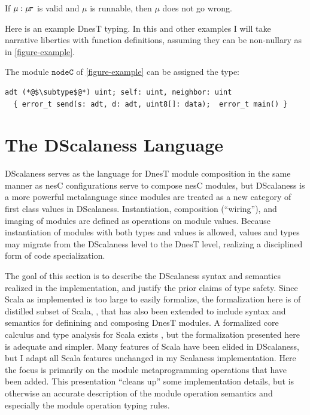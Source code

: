 \declmodtypingfig

\begin{conject}
  If $\mu : \mu\!\tau$ is valid and $\mu$ is runnable, then $\mu$ does not go wrong.
\end{conject}
Here is an example DnesT typing. In this and other examples I will take narrative liberties with
function definitions, assuming they can be non-nullary as in \autoref{figure-example}.
\begin{example}
\label{example-nesttyping}
The module $\texttt{nodeC}$ of \autoref{figure-example} can be assigned the type:
\singlespace
\lstset{numbers=none, basicstyle=\ttfamily} 
\begin{lstlisting}
adt (*@$\subtype$@*) uint; self: uint, neighbor: uint
  { error_t send(s: adt, d: adt, uint8[]: data);  error_t main() }
\end{lstlisting}
\primaryspacing
\end{example}


\section{The DScalaness Language}
\label{section-scalaness-theory}

DScalaness serves as the language for DnesT module composition in the same manner as nesC
configurations serve to compose nesC modules, but DScalaness is a more powerful metalanguage
since modules are treated as a new category of first class values in DScalaness. Instantiation,
composition (``wiring''), and imaging of modules are defined as operations on module values.
Because instantiation of modules with both types and values is allowed, values and types may
migrate from the DScalaness level to the DnesT level, realizing a disciplined form of code
specialization.

The goal of this section is to describe the DScalaness syntax and semantics realized in the
implementation, and justify the prior claims of type safety. Since Scala as implemented is too
large to easily formalize, the formalization here is of distilled subset of Scala,
, that has also been extended to include syntax and semantics for definining
and composing DnesT modules. A formalized core calculus and type analysis for Scala exists
\cite{Cremet:2006:CCS:2135978.2135980}, but the formalization presented here is adequate and
simpler. Many features of Scala have been elided in DScalaness, but I adapt all Scala features
unchanged in my Scalaness implementation. Here the focus is primarily on the module
metaprogramming operations that have been added. This presentation ``cleans up'' some
implementation details, but is otherwise an accurate description of the module operation
semantics and especially the module operation typing rules.

